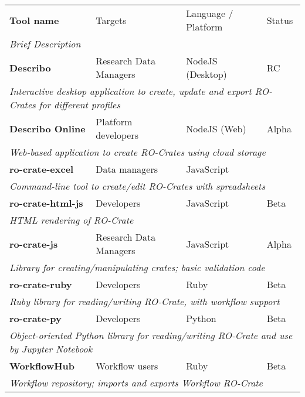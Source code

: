 \begin{table}[htbp]
	\centering
	\begin{tabular}{llll}
		\toprule
		\textbf{Tool name} & Targets & Language / Platform & Status \\
		\multicolumn{4}{l}{\it Brief Description} \\
		\midrule
		
		\textbf{Describo} \citep{describo} & Research Data Managers & NodeJS (Desktop) & RC \\
		\multicolumn{4}{l}{\it Interactive desktop application to create, update and export RO-Crates for different profiles} \\
		
		\textbf{Describo Online} \citep{describo-online} & Platform developers & NodeJS (Web) & Alpha \\
		\multicolumn{4}{l}{\it Web-based application to create RO-Crates using cloud storage} \\
		
		\textbf{ro-crate-excel} \citep{ro-crate-excel} & Data managers & JavaScript \\
		\multicolumn{4}{l}{\it Command-line tool to create/edit RO-Crates with spreadsheets} \\
		
		\textbf{ro-crate-html-js} \citep{ro-crate-html-js} & Developers & JavaScript & Beta \\
		\multicolumn{4}{l}{\it HTML rendering of RO-Crate}  \\
		
		\textbf{ro-crate-js} \citep{ro-crate-js} & Research Data Managers & JavaScript & Alpha \\
		\multicolumn{4}{l}{\it Library for creating/manipulating crates; basic validation code} \\
		
		\textbf{ro-crate-ruby} \citep{ro-crate-ruby} & Developers & Ruby & Beta \\
		\multicolumn{4}{l}{\it Ruby library for reading/writing RO-Crate, with workflow support} \\
		
		\textbf{ro-crate-py} \citep{ro-crate-py} & Developers & Python & Beta \\
		\multicolumn{4}{l}{\it Object-oriented Python library for reading/writing RO-Crate and use by Jupyter Notebook} \\
		
		\textbf{WorkflowHub} \citep{about-workflowhub} & Workflow users & Ruby & Beta \\
		\multicolumn{4}{l}{\it Workflow repository; imports and exports Workflow RO-Crate} \\
		

\end{tabular}
\end{table}
